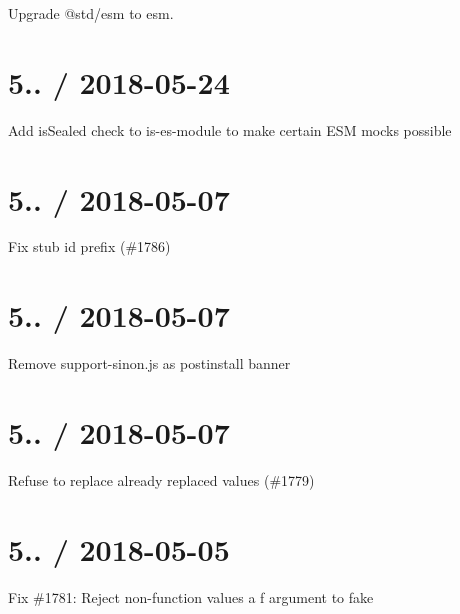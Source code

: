 \begin{DoxyItemize}
\item Upgrade {\ttfamily @std/esm} to {\ttfamily esm}.
\end{DoxyItemize}

\section*{5.. / 2018-\/05-\/24 }


\begin{DoxyItemize}
\item Add is\+Sealed check to is-\/es-\/module to make certain E\+SM mocks possible
\end{DoxyItemize}

\section*{5.. / 2018-\/05-\/07 }


\begin{DoxyItemize}
\item Fix stub id prefix (\#1786)
\end{DoxyItemize}

\section*{5.. / 2018-\/05-\/07 }


\begin{DoxyItemize}
\item Remove support-\/sinon.\+js as postinstall banner
\end{DoxyItemize}

\section*{5.. / 2018-\/05-\/07 }


\begin{DoxyItemize}
\item Refuse to replace already replaced values (\#1779)
\end{DoxyItemize}

\section*{5.. / 2018-\/05-\/05 }


\begin{DoxyItemize}
\item Fix \#1781\+: Reject non-\/function values a f argument to fake
\end{DoxyItemize}

